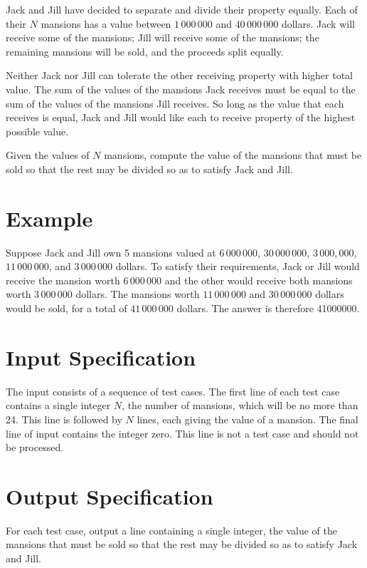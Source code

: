 
Jack and Jill have decided to separate and divide their property equally. Each of their $N$ mansions
has a value between $1\,000\,000$ and $40\,000\,000$ dollars. Jack will receive some of the
mansions; Jill will receive some of the mansions; the remaining mansions will be sold, and the
proceeds split equally.

Neither Jack nor Jill can tolerate the other receiving property with higher total value. The sum of
the values of the mansions Jack receives must be equal to the sum of the values of the mansions Jill
receives.  So long as the value that each receives is equal, Jack and Jill would like each to
receive property of the highest possible value.

Given the values of $N$ mansions, compute the value of the mansions that must be sold so that the
rest may be divided so as to satisfy Jack and Jill.

\section*{Example}
Suppose Jack and Jill own 5 mansions valued at $6\,000\,000$, $30\,000\,000$, $3\,000,000$,
$11\,000\,000$, and $3\,000\,000$ dollars.  To satisfy their requirements, Jack or Jill would
receive the mansion worth $6\,000\,000$ and the other would receive both mansions worth
$3\,000\,000$ dollars. The mansions worth $11\,000\,000$ and $30\,000\,000$ dollars would be sold,
for a total of $41\,000\,000$ dollars.  The answer is therefore 41000000.

\section*{Input Specification}
The input consists of a sequence of test cases. The first line of each test case contains a single
integer $N$, the number of mansions, which will be no more than 24. This line is followed by
$N$ lines, each giving the value of a mansion. The final line of input contains the integer
zero. This line is not a test case and should not be processed.

\section*{Output Specification}
For each test case, output a line containing a single integer, the value of the mansions that must
be sold so that the rest may be divided so as to satisfy Jack and Jill.
